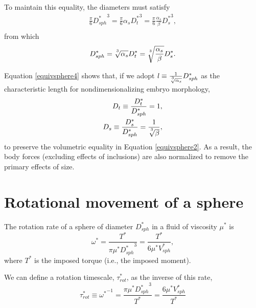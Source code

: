 \documentclass[10pt,a4paper]{article}
\def\non{\nonumber}
\begin{document}
To maintain this equality, the diameters must satisfy
\begin{eqnarray}\label{equivsphere3}
	\frac{\pi}{6} {D_{sph}^*}^3 = \frac{\pi}{6} \alpha_s {D_t^*}^3  = \frac{\pi}{6} \frac{\alpha_s}{\beta} {D_s^*}^3, \non \\
\end{eqnarray} 
from which
\begin{eqnarray}\label{equivsphere4}
	D_{sph}^* = \sqrt[\uproot{5}3]{\alpha_s} D_t^* = \sqrt[\uproot{5}3]{\frac{\alpha_s}{\beta}} D_s^*.
\end{eqnarray} 

Equation \ref{equivsphere4} shows that, if we adopt $\mathit{l} \equiv \frac{1}{\sqrt[\uproot{5}3]{\alpha_s}} D_{sph}^*$ as the characteristic length for nondimensionalizing embryo morphology,
\begin{eqnarray}\label{ndD}
	D_t \equiv \frac{D_t^*}{D_{sph}^*} = 1, \non \\
	D_s \equiv \frac{D_s^*}{D_{sph}^*} = \frac{1}{\sqrt[\uproot{5}3]{\beta}},
\end{eqnarray} 
to preserve the volumetric equality in Equation \ref{equivsphere2}.
As a result, the body forces (excluding effects of inclusions) are also normalized to remove the primary effects of size.

\section{Rotational movement of a sphere}\label{RotSect}
The rotation rate of a sphere of diameter $D_{sph}^*$ in a fluid of viscosity $\mu^*$ is 
\begin{equation}\label{rot1}
	\omega^* = \frac{T^*}{\pi \mu^* {D_{sph}^*}^3} = \frac{T^*}{6 \mu^* V_{sph}^*},	
\end{equation}
where $T^*$ is the imposed torque (i.e., the imposed moment).

We can define a rotation timescale, $\tau^*_{rot}$, as the inverse of this rate,
\begin{equation}\label{tau1}
	\tau^*_{rot} \equiv {\omega^*}^{-1} = \frac{\pi \mu^* {D_{sph}^*}^3}{T^*} = \frac{6 \mu^* V_{sph}^*}{T^*}
\end{equation}
\end{document}
